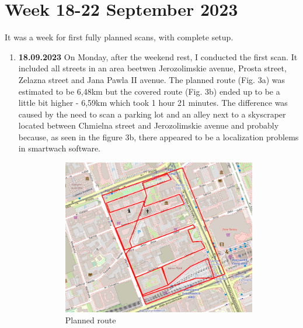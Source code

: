 \documentclass[a4paper,12pt]{article}
\begin{document}
\section{Week 18-22 September 2023}
It was a week for first fully planned scans, with complete setup. 
\begin{enumerate}
	\item \textbf{18.09.2023} On Monday, after the weekend rest, I conducted the first scan. It included all streets in an area beetwen Jerozolimskie avenue, Prosta street, Zelazna street and Jana Pawla II avenue. The planned route (Fig. 3a) was estimated to be 6,48km but the covered route (Fig. 3b) ended up to be a little bit higher - 6,59km which took 1 hour 21 minutes. The difference was caused by the need to scan a parking lot and an alley next to a skyscraper located between Chmielna street and Jerozolimskie avenue and probably because, as seen in the figure 3b, there appeared to be a localization problems in smartwach software.
	\begin{figure}[H]
		\centering
		\begin{subfigure}{.90\textwidth}
			\centering
			\includegraphics[width=1\linewidth]{route_p2}
			\caption{Planned route}
			\label{fig:a2}
		\end{subfigure}%
		\linebreak
		\begin{subfigure}{.90\textwidth}
			\centering

\end{subfigure}
\end{figure}
\end{enumerate}
\end{document}

